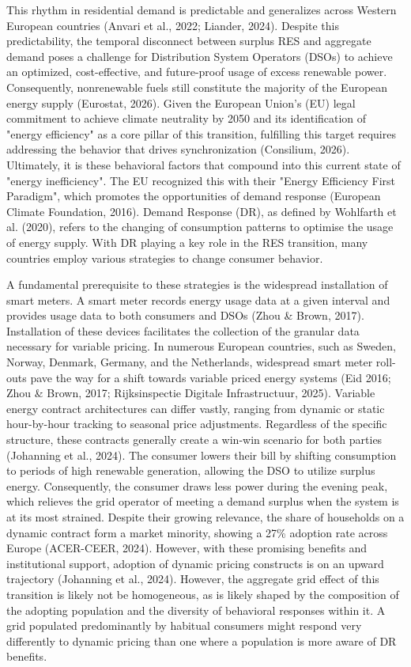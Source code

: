 \documentclass[11pt, a4paper]{article}
\begin{document}
This rhythm in residential demand is predictable and generalizes across Western European countries (Anvari et al., 2022; Liander, 2024). Despite this predictability, the temporal disconnect between surplus RES and aggregate demand poses a challenge for Distribution System Operators (DSOs) to achieve an optimized, cost-effective, and future-proof usage of excess renewable power. Consequently, nonrenewable fuels still constitute the majority of the European energy supply (Eurostat, 2026). Given the European Union’s (EU) legal commitment to achieve climate neutrality by 2050 and its identification of "energy efficiency" as a core pillar of this transition, fulfilling this target requires addressing the behavior that drives synchronization (Consilium, 2026). Ultimately, it is these behavioral factors that compound into this current state of "energy inefficiency". The EU recognized this with their "Energy Efficiency First Paradigm", which promotes the opportunities of demand response (European Climate Foundation, 2016). Demand Response (DR), as defined by Wohlfarth et al. (2020), refers to the changing of consumption patterns to optimise the usage of energy supply. With DR playing a key role in the RES transition, many countries employ various strategies to change consumer behavior. 

A fundamental prerequisite to these strategies is the widespread installation of smart meters. A smart meter records energy usage data at a given interval and provides usage data to both consumers and DSOs (Zhou \& Brown, 2017). Installation of these devices facilitates the collection of the granular data necessary for variable pricing. In numerous European countries, such as Sweden, Norway, Denmark, Germany, and the Netherlands, widespread smart meter roll-outs pave the way for a shift towards variable priced energy systems (Eid 2016; Zhou \& Brown, 2017; Rijksinspectie Digitale Infrastructuur, 2025). Variable energy contract architectures can differ vastly, ranging from dynamic or static hour-by-hour tracking to seasonal price adjustments. Regardless of the specific structure, these contracts generally create a win-win scenario for both parties (Johanning et al., 2024). The consumer lowers their bill by shifting consumption to periods of high renewable generation, allowing the DSO to utilize surplus energy. Consequently, the consumer draws less power during the evening peak, which relieves the grid operator of meeting a demand surplus when the system is at its most strained. Despite their growing relevance, the share of households on a dynamic contract form a market minority, showing a 27\% adoption rate across Europe (ACER-CEER, 2024).  However, with these promising benefits and institutional support, adoption of dynamic pricing constructs is on an upward trajectory (Johanning et al., 2024). However, the aggregate grid effect of this transition is likely not be homogeneous, as is likely shaped by the composition of the adopting population and the diversity of behavioral responses within it. A grid populated predominantly by habitual consumers might respond very differently to dynamic pricing than one where a population is more aware of DR benefits.
\end{document}
